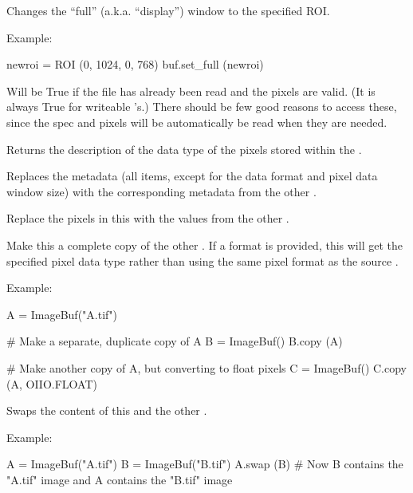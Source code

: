 Changes the ``full'' (a.k.a. ``display'') window to the specified ROI.

\noindent Example:
\begin{code}
    newroi = ROI (0, 1024, 0, 768)
    buf.set_full (newroi)
\end{code}
\apiend

Will be {\cf True} if the file has already been read and the pixels are
valid. (It is always {\cf True} for writeable \ImageBuf's.)
There should be few good reasons to access these, since the spec and pixels
will be automatically be read when they are needed. 
\apiend

Returns the description of the data type of the pixels stored within the
\ImageBuf.
\apiend

Replaces the metadata (all \ImageSpec items, except for the data format
and pixel data window size) with the corresponding metadata from the
other \ImageBuf.
\apiend

Replace the pixels in this \ImageBuf with the values from the other
\ImageBuf.
\apiend

Make this \ImageBuf a complete copy of the other \ImageBuf.
If a {\cf format} is provided, {\cf this} will get the specified pixel
data type rather than using the same pixel format as the source \ImageBuf.

\noindent Example:
\begin{code}
    A = ImageBuf("A.tif")

    # Make a separate, duplicate copy of A
    B = ImageBuf()
    B.copy (A)

    # Make another copy of A, but converting to float pixels
    C = ImageBuf()
    C.copy (A, OIIO.FLOAT)
\end{code}
\apiend

Swaps the content of this \ImageBuf and the other \ImageBuf.

\noindent Example:
\begin{code}
    A = ImageBuf("A.tif")
    B = ImageBuf("B.tif")
    A.swap (B)
    # Now B contains the "A.tif" image and A contains the "B.tif" image
\end{code}
\apiend

